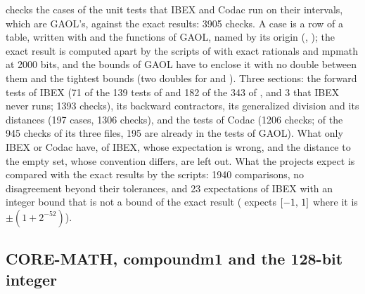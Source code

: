 \documentclass[12pt,a4paper,twoside,openright]{book}
\begin{document}
\medskip
{} checks the cases of the unit tests that IBEX and
Codac run on their intervals, which are GAOL's, against the exact results:
3905 checks.\newinvfive{} A case is a row of a table, written with
 and the functions of GAOL, named by its origin
(, ); the
exact result is computed apart by the scripts of
 with exact rationals and mpmath at 2000 bits,
and the bounds of GAOL have to enclose it with no double between them and
the tightest bounds (two doubles for  and
). Three sections: the forward tests of IBEX (71 of the
139 tests of  and 182 of the 343 of ,
and 3 that IBEX never runs; 1393 checks), its backward contractors, its
generalized division and its distances (197 cases, 1306 checks), and the
tests of Codac (1206 checks; of the 945 checks of its three files, 195 are
already in the tests of GAOL). What only IBEX or Codac have,  of
IBEX, whose expectation is wrong, and the distance to the empty set, whose
convention differs, are left out. What the projects expect is compared with
the exact results by the scripts: 1940 comparisons, no disagreement beyond
their tolerances, and 23 expectations of IBEX with an integer bound that is
not a bound of the exact result ( expects $[-1,\,1]$ where it
is $\pm(1+2^{-52})$).

\subsection{CORE-MATH, compoundm1 and the 128-bit integer}
\end{document}
